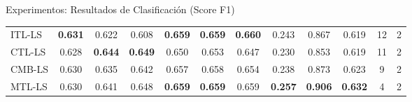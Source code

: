 \documentclass[aspectratio=43,spanish]{beamer}
\newcommand{\fmaxn}[1]{\textbf{#1}}
\newcommand{\fmod}[1]{\textsf{#1}}
\begin{document}
\begin{frame}{Experimentos: Resultados de Clasificación (Score F1)}
\begin{table}[t]
{\begin{tabular}{ l*{8}{S[table-format=1.3]} c c c}
              \midrule
              \fmod{ITL-LS}    &          \fmaxn{0.631} &           0.622 &                  0.608 &         \fmaxn{0.659} &          \fmaxn{0.659} &                 \fmaxn{0.660} &    0.243 &   0.867 & 0.619 &     12 & 2 \\
              \fmod{CTL-LS}    &          0.628 &           \fmaxn{0.644} &                  \fmaxn{0.649} &         0.650 &          0.653 &                 0.647 &    0.230 &   0.853 & 0.619 &     11 & 2 \\
              \fmod{CMB-LS} &          0.630 &           0.635 &                  0.642 &         0.657 &          0.658 &                 0.654 &    0.238 &   0.873 & 0.623 &      9 & 2 \\
              \fmod{MTL-LS}    &          0.630 &           0.641 &                  0.648 &         \fmaxn{0.659} &          \fmaxn{0.659} &                 0.659 &    \fmaxn{0.257} &   \fmaxn{0.906} & \fmaxn{0.632} &      4 & 2 \\
              \bottomrule
            \end{tabular}}
        \end{table}
  
  \end{frame}
  
  
  
\end{document}
